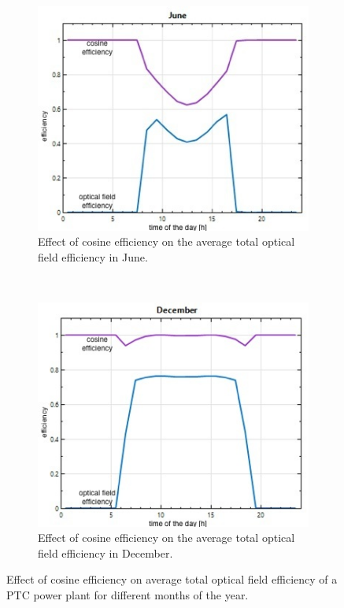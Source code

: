 \begin{figure}[!htbp]
        \centering                
        \begin{subfigure}[b]{0.5\textwidth}
                \centering
                \includegraphics[width=1\textwidth]{FIG/PTC_field_eff_winter}
                \caption{Effect of cosine efficiency on the average total optical field efficiency in June.}\label{PTC_field_eff_winter}
        \end{subfigure}%
        ~
        \begin{subfigure}[b]{0.5\textwidth}
                \centering
                \includegraphics[width=1\textwidth]{FIG/PTC_field_eff_summer}
                \caption{Effect of cosine efficiency on the average total optical field efficiency in December.}\label{PTC_field_eff_summer}
        \end{subfigure}
        \caption[Effect of cosine efficiency on average total optical field efficiency of a PTC power plant for different months of the year.]{Effect of cosine efficiency on average total optical field efficiency of a PTC power plant for different months of the year.}\label{PTC_field_eff}
\end{figure}
